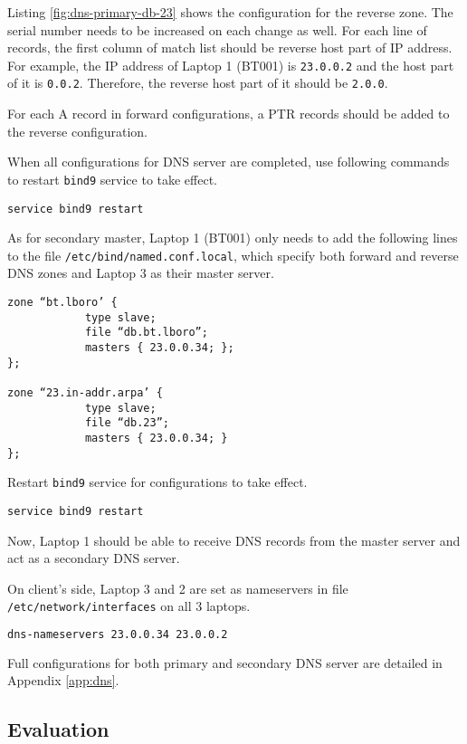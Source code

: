 Listing \ref{fig:dns-primary-db-23} shows the configuration for the reverse zone. 
The serial number needs to be increased on each change as well. 
For each line of records, the first column of match list should be reverse host part of IP address. 
For example, the IP address of Laptop 1 (BT001) is \texttt{23.0.0.2} and the host part of it is \texttt{0.0.2}. Therefore, the reverse host part of it should be \texttt{2.0.0}. 

For each A record in forward configurations, a PTR records should be added to the reverse configuration.

When all configurations for DNS server are completed, use following commands to restart \texttt{bind9} service to take effect.

\begin{lstlisting}
service bind9 restart
\end{lstlisting}

As for secondary master, Laptop 1 (BT001) only needs to add the following lines to the file \texttt{/etc/bind/named.conf.local}, which specify both forward and reverse DNS zones and Laptop 3 as their master server.

\begin{lstlisting}
zone “bt.lboro’ {
			type slave;
			file “db.bt.lboro”;
			masters { 23.0.0.34; };
};

zone “23.in-addr.arpa’ {
			type slave;
			file “db.23”;
			masters { 23.0.0.34; }
};
\end{lstlisting}

Restart \texttt{bind9} service for configurations to take effect.

\begin{lstlisting}
service bind9 restart
\end{lstlisting}

Now, Laptop 1 should be able to receive DNS records from the master server and act as a secondary DNS server.

On client's side, Laptop 3 and 2 are set as nameservers in file \texttt{/etc/network/interfaces} on all $3$ laptops.

\begin{lstlisting}[language=sh]
dns-nameservers 23.0.0.34 23.0.0.2
\end{lstlisting}

Full configurations for both primary and secondary DNS server are detailed in Appendix \ref{app:dns}.


\subsection{Evaluation}

